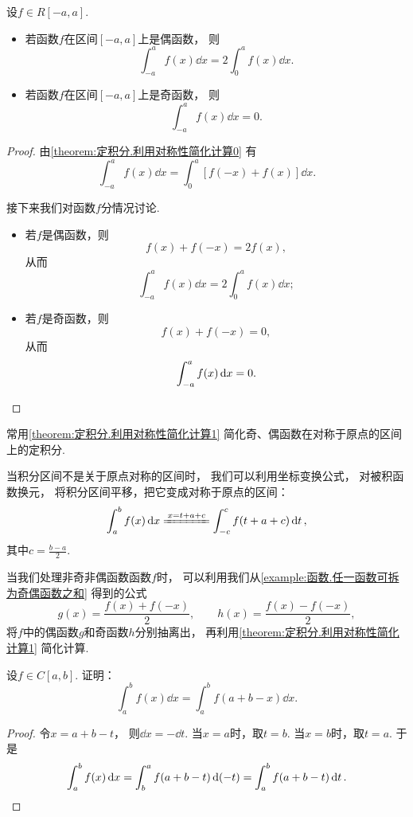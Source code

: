 \begin{proposition}\label{theorem:定积分.利用对称性简化计算1}
设\(f \in R[-a,a]\).
\begin{itemize}
	\item 若函数\(f\)在区间\([-a,a]\)上是偶函数，
	则\[
		\int_{-a}^a f(x) \dd{x} = 2 \int_0^a f(x) \dd{x}.
	\]

	\item 若函数\(f\)在区间\([-a,a]\)上是奇函数，
	则\[
		\int_{-a}^a f(x) \dd{x} = 0.
	\]
\end{itemize}
\begin{proof}
由\cref{theorem:定积分.利用对称性简化计算0} 有\[
	\int_{-a}^a f(x) \dd{x}
	= \int_0^a [f(-x) + f(x)] \dd{x}.
\]

接下来我们对函数\(f\)分情况讨论.
\begin{itemize}
	\item 若\(f\)是偶函数，则\[
		f(x) + f(-x) = 2 f(x),
	\]
	从而\[
		\int_{-a}^a f(x) \dd{x} = 2 \int_0^a f(x) \dd{x};
	\]

	\item 若\(f\)是奇函数，则\[
		f(x) + f(-x) = 0,
	\]
	从而\[
		\int_{-a}^a f(x) \dd{x} = 0.
		\qedhere
	\]
\end{itemize}
\end{proof}
\end{proposition}
\begin{remark}
常用\cref{theorem:定积分.利用对称性简化计算1} 简化奇、偶函数在对称于原点的区间上的定积分.

当积分区间不是关于原点对称的区间时，
我们可以利用坐标变换公式，
对被积函数换元，
将积分区间平移，把它变成对称于原点的区间：\[
	\int_a^b f(x) \dd{x}
	\xlongequal{x=t+a+c}
	\int_{-c}^c f(t+a+c) \dd{t},
\]
其中\(c=\frac{b-a}2\).

当我们处理非奇非偶函数函数\(f\)时，
可以利用我们从\cref{example:函数.任一函数可拆为奇偶函数之和} 得到的公式\[
	g(x) = \frac{f(x) + f(-x)}{2}, \qquad
	h(x) = \frac{f(x) - f(-x)}{2},
\]
将\(f\)中的偶函数\(g\)和奇函数\(h\)分别抽离出，
再利用\cref{theorem:定积分.利用对称性简化计算1} 简化计算.
\end{remark}

\begin{proposition}\label{theorem:定积分.区间再现}
设\(f \in C[a,b]\).
证明：\begin{equation}
	\int_a^b f(x) \dd{x}
	= \int_a^b f(a+b-x) \dd{x}.
\end{equation}
\begin{proof}
令\(x=a+b-t\)，
则\(\dd{x} = -\dd{t}\).
当\(x=a\)时，取\(t=b\).
当\(x=b\)时，取\(t=a\).
于是\[
	\int_a^b f(x) \dd{x}
	= \int_b^a f(a+b-t) \dd(-t)
	= \int_a^b f(a+b-t) \dd{t}.
	\qedhere
\]
\end{proof}
\end{proposition}

